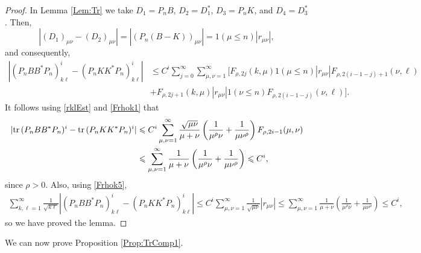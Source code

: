 \documentclass{article}
\numberwithin{equation}{section}
\numberwithin{figure}{section}
\theoremstyle{plain}
\theoremstyle{plain}
\numberwithin{thm}{section}
\theoremstyle{remark}
\newcommand{\Tr}{\text{{\rm tr\,}}}
\let \le \leqslant
\begin{document}
\begin{proof}
In Lemma \ref{Lem:Tr} we take $D_1=P_nB$, $D_2=D_1^*$, $D_3=P_nK$, and $D_4=D_3^*$. Then,
\begin{equation*}
    |(D_1)_{\mu\nu}-(D_2)_{\mu\nu}|=|(P_n(B-K))_{\mu\nu}|=1(\mu\le n)|r_{\mu\nu}|,
\end{equation*}
and consequently, 
\begin{align*}
 |(P_nBB^*P_n)^i_{k\ell}-(P_nKK^*P_n)^i_{k\ell}|&\le   
 C^i\sum_{j=0}^\infty\sum_{\mu,\nu=1}^\infty\Big[F_{\rho,2j}(k,\mu)1(\mu\le n)|r_{\mu\nu}|F_{\rho,2(i-1-j)+1}(\nu,\ell)\\
 &+F_{\rho,2j+1}(k,\mu)|r_{\mu\nu}|1(\nu\le n)F_{\rho,2(i-1-j)}(\nu,\ell)\Big].
\end{align*}
It follows using \eqref{rklEst} and \eqref{Frhok1} that
\begin{align*}
|\Tr(P_nBB^*P_n)^i-\Tr(P_nKK^*P_n)^i|&\le C^i  \sum_{\mu,\nu=1}^\infty \frac{\sqrt{\mu\nu}}{\mu+\nu}\left(\frac 1{\mu^\rho\nu}+\frac 1{\mu\nu^\rho}\right)F_{\rho,2i-1}(\mu,\nu)\\
&\le\sum_{\mu,\nu=1}^\infty \frac{1}{\mu+\nu}\left(\frac 1{\mu^\rho\nu}+\frac 1{\mu\nu^\rho}\right)\le C^i,
\end{align*}
since $\rho>0$. Also, using \eqref{Frhok5},
\begin{align*}
  \sum_{k,\ell=1}^\infty\frac 1{\sqrt{k\ell}}|(P_nBB^*P_n)^i_{k\ell}-(P_nKK^*P_n)^i_{k\ell}|\le C^i  \sum_{\mu,\nu=1}^\infty\frac 1{\sqrt{\mu\nu}}|r_{\mu\nu}|
  \le \sum_{\mu,\nu=1}^\infty\frac 1{\mu+\nu}\left(\frac 1{\mu^\rho\nu}+\frac 1{\mu\nu^\rho}\right)\le C^i,
\end{align*}
so we have proved the lemma.
\end{proof}

We can now prove Proposition \ref{Prop:TrComp1}.
\end{document}
